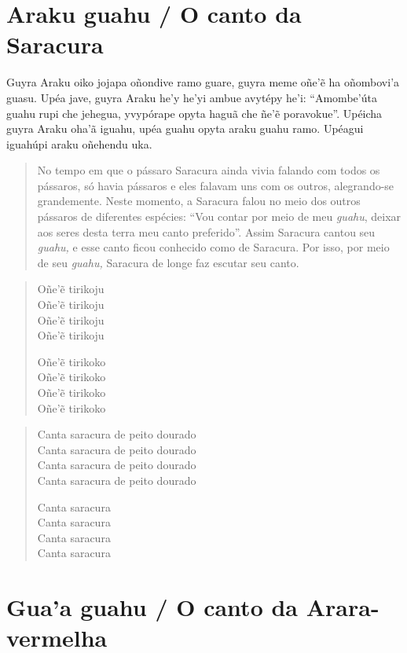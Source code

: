 \chapter{Araku guahu / O canto da Saracura}

Guyra Araku oiko jojapa oñondive ramo guare, guyra meme oñe'ẽ ha
oñombovi'a guasu. Upéa jave, guyra Araku he'y he'yi ambue avytépy he'i:
``Amombe'úta guahu rupi che jehegua, yvypórape opyta haguã che ñe'ẽ
poravokue''. Upéicha guyra Araku oha'ã iguahu, upéa guahu opyta araku
guahu ramo. Upéagui iguahúpi araku oñehendu uka.

\begin{quote}
No tempo em que o pássaro Saracura ainda vivia falando com todos os
pássaros, só havia pássaros e eles falavam uns com os outros,
alegrando-se grandemente. Neste momento, a Saracura falou no meio dos
outros pássaros de diferentes espécies: ``Vou contar por meio de meu
\emph{guahu}, deixar aos seres desta terra meu canto preferido''. Assim
Saracura cantou seu \emph{guahu,} e esse canto ficou conhecido como de
Saracura. Por isso, por meio de seu \emph{guahu,} Saracura de longe faz
escutar seu canto.
\end{quote}

\begin{verse}
Oñe'ẽ tirikoju\\
Oñe'ẽ tirikoju\\
Oñe'ẽ tirikoju\\
Oñe'ẽ tirikoju

Oñe'ẽ tirikoko\\
Oñe'ẽ tirikoko\\
Oñe'ẽ tirikoko\\
Oñe'ẽ tirikoko
\end{verse}

\begin{verse}
Canta saracura de peito dourado\\
Canta saracura de peito dourado\\
Canta saracura de peito dourado\\
Canta saracura de peito dourado

Canta saracura\\
Canta saracura\\
Canta saracura\\
Canta saracura
\end{verse}

\chapter{Gua'a guahu / O canto da Arara-vermelha}

